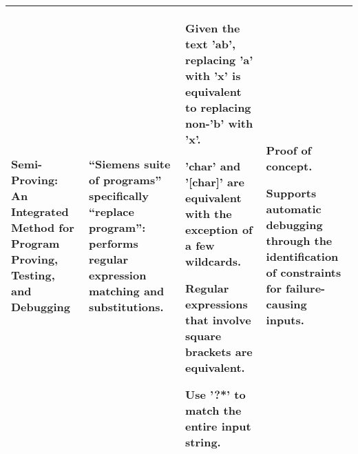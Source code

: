 \begin{singlespace}
\begin{longtable}[c]{| p{3cm} | p{5cm} | p{3cm} | p{3cm} |}
  Semi-Proving: An Integrated Method for Program Proving, Testing, and Debugging             &
  “Siemens suite of programs” specifically “replace program”: performs regular expression matching and substitutions.                                                                           &
  Given the text 'ab', replacing 'a' with 'x' is equivalent to replacing non-'b' with 'x'. \par\medskip
  'char' and '[char]' are equivalent with the exception of a few wildcards. \par\medskip
  Regular expressions that involve square brackets are equivalent. \par\medskip
  Use '?*' to match the entire input string.                                                             &
  Proof of concept. \par\medskip
  Supports automatic debugging through the identification of constraints for failure-causing inputs.
  \\

  \hline

 \end{longtable}
\end{singlespace}
